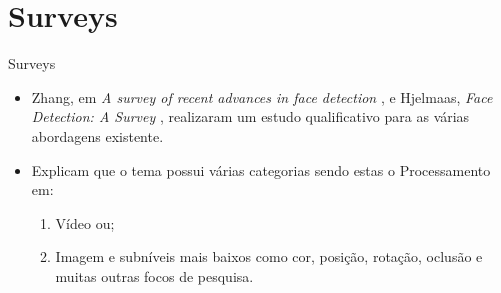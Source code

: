 \documentclass[aspectratio=169, xcolor=dvipsnames]{beamer}
\let\olditem=\item%
\renewcommand{\item}{\olditem \justifying}
\begin{document}
\section{Surveys}
\begin{frame}{Surveys}
	\begin{itemize}
		\setlength{\itemsep}{1.5em}
		\item Zhang, em \textit{A survey of recent advances in face detection} \cite{zhang2010survey}, e Hjelmaas, \textit{Face Detection: A Survey} \cite{hjelmaas2001face}, realizaram um estudo qualificativo para as várias abordagens existente. 
		
		\item Explicam que o tema possui várias categorias sendo estas o Processamento em:
		\begin{enumerate}
			\setlength{\itemsep}{1em}
			\item Vídeo ou;
			\item Imagem e subníveis mais baixos como cor, posição, rotação, oclusão e muitas outras focos de pesquisa. 
		\end{enumerate}
	\end{itemize}
\end{frame}
\end{document}
